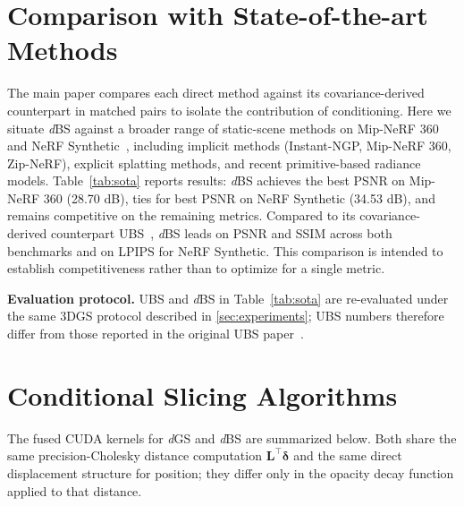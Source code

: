 \documentclass{article}
\newcommand{\dgs}{\textit{d}GS\xspace}
\newcommand{\dbs}{\textit{d}BS\xspace}
\theoremstyle{plain}
\theoremstyle{definition}
\theoremstyle{remark}
\begin{document}



\newpage
\appendix


\section{Comparison with State-of-the-art Methods}
\label{app:sota}

The main paper compares each direct method against its covariance-derived counterpart in matched pairs to isolate the contribution of conditioning. Here we situate \dbs{} against a broader range of static-scene methods on Mip-NeRF 360~\citep{barron2021mipnerf} and NeRF Synthetic~\citep{mildenhall2021nerf}, including implicit methods (Instant-NGP, Mip-NeRF 360, Zip-NeRF), explicit splatting methods, and recent primitive-based radiance models. Table~\ref{tab:sota} reports results: \dbs{} achieves the best PSNR on Mip-NeRF 360 (28.70 dB), ties for best PSNR on NeRF Synthetic (34.53 dB), and remains competitive on the remaining metrics. Compared to its covariance-derived counterpart UBS~\citep{liu2025universal}, \dbs{} leads on PSNR and SSIM across both benchmarks and on LPIPS for NeRF Synthetic. This comparison is intended to establish competitiveness rather than to optimize for a single metric.

\textbf{Evaluation protocol.} UBS and \dbs{} in Table~\ref{tab:sota} are re-evaluated under the same 3DGS protocol described in \cref{sec:experiments}; UBS numbers therefore differ from those reported in the original UBS paper~\citep{liu2025universal}.



\section{Conditional Slicing Algorithms}
\label{sec:algorithms}

The fused CUDA kernels for \dgs{} and \dbs{} are summarized below. Both share the same precision-Cholesky distance computation $\mathbf{L}^\top\boldsymbol{\delta}$ and the same direct displacement structure for position; they differ only in the opacity decay function applied to that distance.
\end{document}
